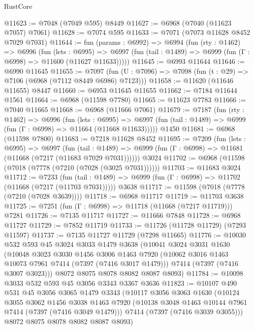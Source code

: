 \begin{lexlean}{RustCore}
\begin{coremodule}
@11623 := @7048 (@7049 @595) @8449
@11627 := @6968 (@7040 (@11623 @7057) @7061)
@11628 := @7074 @595
@11633 := @7071 (@7073 @11628 @8452 @7029 @7031)
@11644 := fun (params : @6992) =>
  @6994
    (fun (rty : @1462) =>
    @6996
      (fun (lets : @6995) =>
      @6997 (fun (tail : @1489) => @6999 (fun (Γ : @6998) => @11600 (@11627 @11633)))))
@11645 := @6993 @11644
@11646 := @6990 @11645
@11655 := @7097
    (fun (U : @7096) => @7098 (fun (t : @29) => @7106 (@6968 (@7112 @8449 @6986) @7123)))
@11658 := @11620 (@11646 @11655) @8447
@11660 := @6953 @11645 @11655
@11662 := @7184 @11644 @1561
@11664 := @6968 (@11598 @7780)
@11665 := @11623 @7783
@11666 := @7040 @11665
@11668 := @6968 (@11666 @7061)
@11679 := @7187
    (fun (rty : @1462) =>
    @6996
      (fun (lets : @6995) =>
      @6997 (fun (tail : @1489) => @6999 (fun (Γ : @6998) => @11664 (@11668 @11633)))))
    @1450
@11681 := @6968 (@11598 @7800)
@11683 := @7218 @11628 @8452
@11695 := @7209
    (fun (lets : @6995) =>
    @6997
      (fun (tail : @1489) =>
      @6999 (fun (Γ : @6998) => @11681 (@11668 (@7217 (@11683 @7029 @7031))))))
    @3024
@11702 := @6968 (@11598 (@7018 (@7778 (@7210 (@7028 (@3025 @7031))))))
@11703 := @11683 @3024
@11712 := @7233
    (fun (tail : @1489) => @6999 (fun (Γ : @6998) => @11702 (@11668 (@7217 (@11703 @7031)))))
    @3638
@11717 := @11598 (@7018 (@7778 (@7210 (@7028 @3639))))
@11718 := @6968 @11717
@11719 := @11703 @3638
@11725 := @7251 (fun (Γ : @6998) => @11718 (@11668 (@7217 @11719))) @7281
@11726 := @7135 @11717
@11727 := @11666 @7848
@11728 := @6968 @11727
@11729 := @7852 @11719
@11733 := @11726 (@11728 @11729) (@7293 @11597)
@11737 := @7135 @11727 @11729 (@7298 @11665)
@11776 := @10030
    @532
    @593
    @45
    @3024
    @3033
    @1479
    @3638
    (@10041
      @3024
      @3031
      @1630
      (@10048
        @3023
        @3030
        @1456
        @3006
        @1463
        @7920
        (@10062 @3016 @1463 @10073 @7961 @7414 (@7397 (@7416 @3017 @1479)))
        @7414
        (@7397 (@7416 @3007 @3023)))
      @8072
      @8075
      @8078
      @8082
      @8087
      @8093)
@11784 := @10098 @3033 @532 @593 @45 @3056 @3343 @3367 @3636
@11823 := @10107
    @490
    @531
    @45
    @3056
    @3065
    @1479
    @3343
    (@10117
      @3056
      @3063
      @1630
      (@10124
        @3055
        @3062
        @1456
        @3038
        @1463
        @7920
        (@10138 @3048 @1463 @10144 @7961 @7414 (@7397 (@7416 @3049 @1479)))
        @7414
        (@7397 (@7416 @3039 @3055)))
      @8072
      @8075
      @8078
      @8082
      @8087
      @8093)

\end{coremodule}
\end{lexlean}
